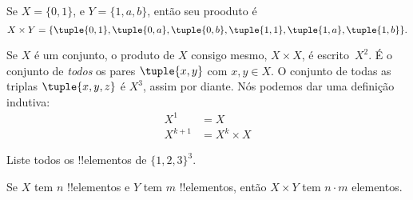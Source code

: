 \documentclass[../../../include/open-logic-section]{subfiles}
\begin{document}

\begin{ex}
Se $X = \{0, 1\}$, e $Y = \{1, a, b\}$, então seu prooduto é
\[
X \times Y = \{ \tuple{0, 1}, \tuple{0, a}, \tuple{0, b},
    \tuple{1, 1}, \tuple{1, a}, \tuple{1, b} \}.
\]
\end{ex}


\begin{ex}
Se $X$ é um conjunto, o produto de $X$ consigo mesmo, $X \times X$, é escrito~$X^2$. É o conjunto de \emph{todos} os pares $\tuple{x, y}$ com $x, y \in X$. O conjunto de todas as triplas $\tuple{x, y, z}$ é $X^3$, assim por diante. Nós podemos dar uma definição indutiva:
\begin{align*}
  X^1 & = X\\
  X^{k+1} & = X^k \times X
\end{align*}
\end{ex}


\begin{prob}
Liste todos os !!{elemento}s de $\{1, 2, 3\}^3$.
\end{prob}


\begin{prop}
Se $X$ tem $n$ !!{elemento}s e $Y$ tem $m$ !!{elemento}s, então $X
\times Y$ tem $n\cdot m$ elementos.
\end{prop}
\end{document}
